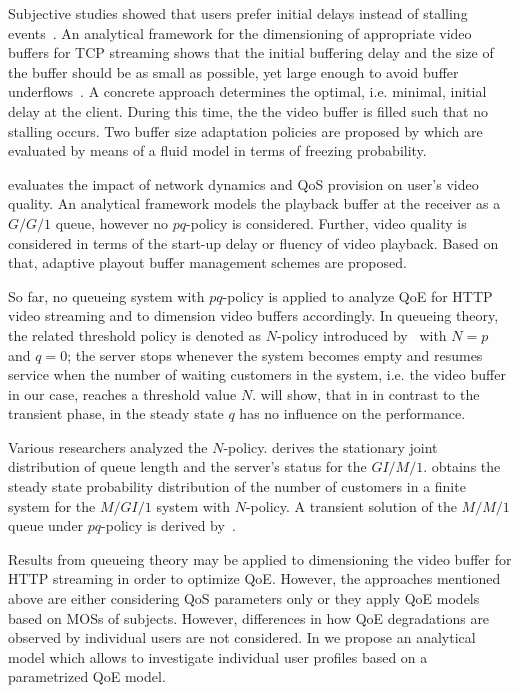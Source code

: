 Subjective studies showed that users prefer initial delays instead of stalling events~\cite{Hossfeld2012c}.
An analytical framework for the dimensioning of appropriate video buffers for \gls{TCP} streaming shows that the initial buffering delay and the size of the buffer should be as small as possible, yet large enough to avoid buffer underflows~\cite{Yan2011}. 
A concrete approach \cite{Hossfeld2012b} determines the optimal, i.e. minimal, initial delay at the client. During this time, the the video buffer is filled such that no stalling occurs.
Two buffer size adaptation policies are proposed by \cite{Fiedler2014} which are evaluated by means of a fluid model in terms of freezing probability. 

\cite{Luan2010} evaluates the impact of network dynamics and QoS provision on user's video quality. 
An analytical framework models the playback buffer at the receiver as a \(G/G/1\) queue, however no \(pq\)-policy is considered. 
Further, video quality is considered in terms of the start-up delay or fluency of video playback. 
Based on that, adaptive playout buffer management schemes are proposed. 

So far, no queueing system with \(pq\)-policy is applied to analyze \gls{QoE} for \gls{HTTP} video streaming and to dimension video buffers accordingly.
In queueing theory, the related threshold policy is denoted as \(N\)-policy introduced by~\cite{Yadin1963} with \(N=p\) and \(q=0\); the server stops whenever the system becomes empty and resumes service when the number of waiting customers in the system, i.e. the video buffer in our case, reaches a threshold value \(N\).
 will show, that in in contrast to the transient phase, in the steady state \(q\) has no influence on the performance. 

Various researchers analyzed the \(N\)-policy.
\cite{Zhang2004} derives the stationary joint distribution of queue length and the server's status for the \(GI/M/1\).
\cite{Wang2000} obtains the steady state probability distribution of the number of customers in a finite system for the \(M/GI/1\) system with \(N\)-policy.
A transient solution of the \(M/M/1\) queue under \(pq\)-policy is derived by~\cite{Boehm1993}.

Results from queueing theory may be applied to dimensioning the video buffer for \gls{HTTP} streaming in order to optimize \gls{QoE}. 
However, the approaches mentioned above are either considering \gls{QoS} parameters only or they apply \gls{QoE} models based on \glspl{MOS} of subjects.
However, differences in how QoE degradations are observed by individual users are not considered.
In  we propose an analytical model which allows to investigate individual user profiles based on a parametrized QoE model.

